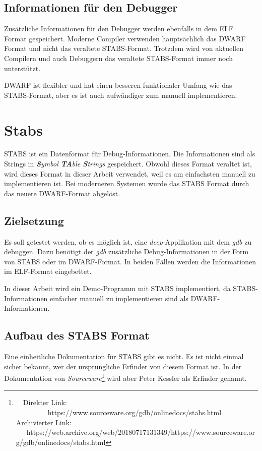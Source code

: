 \subsection{Informationen für den Debugger}
Zusätzliche Informationen für den Debugger werden ebenfalls in dem ELF Format gespeichert.
Moderne Compiler verwenden hauptsächlich das DWARF Format und nicht das veraltete STABS-Format.
Trotzdem wird von aktuellen Compilern und auch Debuggern das veraltete STABS-Format immer noch unterstützt.

DWARF ist flexibler und hat einen besseren funktionaler Umfang wie das STABS-Format, aber es ist auch aufwändiger zum manuell implementieren.





\section{Stabs}
\label{label:stabs}
STABS ist ein Datenformat für Debug-Informationen.
Die Informationen sind als Strings in \textit{\textbf{S}ymbol \textbf{TA}ble \textbf{S}trings} gespeichert.
Obwohl dieses Format veraltet ist, wird dieses Format in dieser Arbeit verwendet, weil es am einfachsten manuell zu implementieren ist.
Bei moderneren Systemen wurde das STABS Format durch das neuere DWARF-Format abgelöst.

\subsection{Zielsetzung}
Es soll getestet werden, ob es möglich ist, eine \textit{deep}-Applikation mit dem \textit{gdb} zu debuggen.
Dazu benötigt der \textit{gdb} zusätzliche Debug-Informationen in der Form von STABS oder im DWARF-Format.
In beiden Fällen werden die Informationen im ELF-Format eingebettet.

In dieser Arbeit wird ein Demo-Programm mit STABS implementiert, da STABS-Informationen einfacher manuell zu implementieren sind als DWARF-Informationen.


\subsection{Aufbau des STABS Format}
Eine einheitliche Dokumentation für STABS gibt es nicht.
Es ist nicht einmal sicher bekannt, wer der ursprüngliche Erfinder von diesem Format ist.
In der Dokumentation von \textit{Sourceware}\footnote{\ \ Direkter Link: \ \ \ \ \ \ \ \ \ https://www.sourceware.org/gdb/onlinedocs/stabs.html\\ Archivierter Link: \ \ \ https://web.archive.org/web/20180717131349/https://www.sourceware.org/gdb/onlinedocs/stabs.html} wird aber Peter Kessler als Erfinder genannt.

